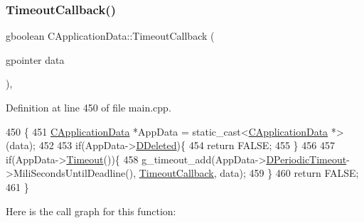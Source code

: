 \subsubsection{\texorpdfstring{Timeout\+Callback()}{TimeoutCallback()}}
{\footnotesize\ttfamily gboolean C\+Application\+Data\+::\+Timeout\+Callback (\begin{DoxyParamCaption}\item[{gpointer}]{data }\end{DoxyParamCaption})\hspace{0.3cm}{\ttfamily [static]}, {\ttfamily [protected]}}



Definition at line 450 of file main.\+cpp.


\begin{DoxyCode}
450                                                        \{
451     \hyperlink{classCApplicationData}{CApplicationData} *AppData = \textcolor{keyword}{static\_cast<}\hyperlink{classCApplicationData}{CApplicationData} *\textcolor{keyword}{>}(data);
452 
453     \textcolor{keywordflow}{if}(AppData->\hyperlink{classCApplicationData_a0a8651f95f3d48befd6e02a286ecdc82}{DDeleted})\{
454         \textcolor{keywordflow}{return} FALSE;   
455     \}
456     
457     \textcolor{keywordflow}{if}(AppData->\hyperlink{classCApplicationData_aae0775b38fac01308e8a81b64db49500}{Timeout}())\{
458         g\_timeout\_add(AppData->\hyperlink{classCApplicationData_a0265cb7aba9f099faed2a1c8ee588d33}{DPeriodicTimeout}->MiliSecondsUntilDeadline(), 
      \hyperlink{classCApplicationData_af66e15f6935f053b46a11aaa51a869c9}{TimeoutCallback}, data);
459     \}
460     \textcolor{keywordflow}{return} FALSE;
461 \}
\end{DoxyCode}
Here is the call graph for this function\+:\nopagebreak
